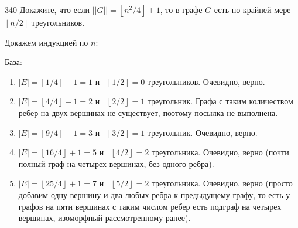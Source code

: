 \begin{task}{340}
Докажите, что если $||G|| = \left\lfloor n^2/4\right\rfloor +1$, то в графе $G$ есть по крайней мере $\left\lfloor n/2\right\rfloor $ треугольников.
\end{task}

\begin{solution}
Докажем индукцией по $n$:\par
\underline{База:}\par
\begin{enumerate}
      \item $|E| = \left\lfloor 1/4\right\rfloor  + 1 = 1$ и \exists \ $\left\lfloor 1/2\right\rfloor  = 0$ треугольников. Очевидно, верно.
    \item $|E| = \left\lfloor 4/4\right\rfloor  + 1 = 2$ и \exists \ $\left\lfloor 2/2\right\rfloor  = 1$ треугольник. Графа с таким количеством ребер на двух вершинах не существует, поэтому посылка не выполнена.
    \item $|E| = \left\lfloor 9/4\right\rfloor  + 1 = 3$ и \exists \ $\left\lfloor 3/2\right\rfloor  = 1$ треугольник. Очевидно, верно.
    \item $|E| = \left\lfloor 16/4\right\rfloor  + 1 = 5$ и \exists \ $\left\lfloor 4/2\right\rfloor  = 2$ треугольника. Очевидно, верно (почти полный граф на четырех вершинах, без одного ребра).
    \item $|E| = \left\lfloor 25/4\right\rfloor  + 1 = 7$ и \exists \ $\left\lfloor 5/2\right\rfloor  = 2$ треугольника. Очевидно, верно (просто добавим одну вершину и два любых ребра к предыдущему графу, то есть у графов на пяти вершинах с таким числом ребер есть подграф на четырех вершинах, изоморфный рассмотренному ранее).
\end{enumerate}


\end{solution}
